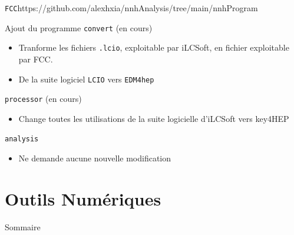 \documentclass[9pt]{beamer}
\begin{document}
\begin{frame}{\texttt{FCC}}{https://github.com/alexhxia/nnhAnalysis/tree/main/nnhProgram}

	\begin{block}{Ajout du programme \texttt{convert} (en cours)}
		\begin{itemize}
			\item Tranforme les fichiers \texttt{.lcio}, exploitable par iLCSoft, en fichier exploitable par FCC.
			\item De la suite logiciel \texttt{LCIO} vers \texttt{EDM4hep}
		\end{itemize}
	\end{block}

	\begin{block}{\texttt{processor} (en cours)}
		\begin{itemize}
			\item Change toutes les utilisations de la suite logicielle d'iLCSoft vers key4HEP
		\end{itemize}
	\end{block}

	\begin{block}{\texttt{analysis}}
		\begin{itemize}
			\item Ne demande aucune nouvelle modification
		\end{itemize}
	\end{block}

\end{frame}


\section{Outils Numériques}

\begin{frame}{Sommaire}
	\begin{columns}[onlytextwidth,T]
        \begin{column}{.45\textwidth}
            \tableofcontents[currentsection, sections=1-2]
        \end{column}
        \begin{column}{.45\textwidth}
            \tableofcontents[currentsection, sections=3-5]
        \end{column}
    \end{columns}
\end{frame}
\end{document}
